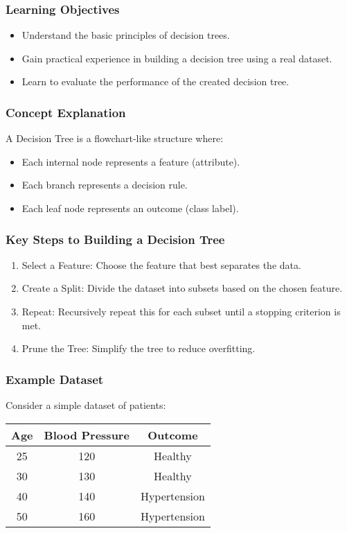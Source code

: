 \documentclass[aspectratio=169]{beamer}
\begin{document}
\begin{frame}
    \frametitle{Learning Objectives}
    \begin{itemize}
        \item Understand the basic principles of decision trees.
        \item Gain practical experience in building a decision tree using a real dataset.
        \item Learn to evaluate the performance of the created decision tree.
    \end{itemize}
\end{frame}

\begin{frame}
    \frametitle{Concept Explanation}
    A Decision Tree is a flowchart-like structure where:
    \begin{itemize}
        \item Each internal node represents a feature (attribute).
        \item Each branch represents a decision rule.
        \item Each leaf node represents an outcome (class label).
    \end{itemize}
\end{frame}

\begin{frame}
    \frametitle{Key Steps to Building a Decision Tree}
    \begin{enumerate}
        \item Select a Feature: Choose the feature that best separates the data.
        \item Create a Split: Divide the dataset into subsets based on the chosen feature.
        \item Repeat: Recursively repeat this for each subset until a stopping criterion is met.
        \item Prune the Tree: Simplify the tree to reduce overfitting.
    \end{enumerate}
\end{frame}

\begin{frame}
    \frametitle{Example Dataset}
    Consider a simple dataset of patients:
    \begin{tabular}{|c|c|c|}
        \hline
        Age & Blood Pressure & Outcome \\
        \hline
        25  & 120 & Healthy \\
        30  & 130 & Healthy \\
        40  & 140 & Hypertension \\
        50  & 160 & Hypertension \\
        \hline
    \end{tabular}
\end{frame}
\end{document}
